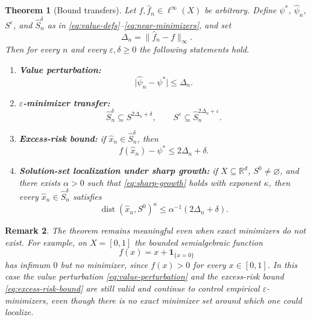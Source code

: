 \documentclass[11pt]{article}
\newtheorem{theorem}{Theorem}[section]
\newtheorem{remark}[theorem]{Remark}
\begin{document}
\begin{theorem}[Bound transfers]\label{thm:deterministic} Let $f,\hat{f}_{n}\in\ell^{\infty}(X)$
be arbitrary. Define $\psi^{*}$, $\hat{\psi}_{n}$, $S^{\varepsilon}$,
and $\hat{S}_{n}^{\delta}$ as in \eqref{eq:value-defs}--\eqref{eq:near-minimizers},
and set
\[
\Delta_{n}=\lVert\hat{f}_{n}-f\rVert_{\infty}.
\]
Then for every $n$ and every $\varepsilon,\delta\ge0$ the following
statements hold. 
\begin{enumerate}[label=(\alph*),itemsep=0.25em]
\item \textbf{Value perturbation:} 
\begin{equation}
\lvert\hat{\psi}_{n}-\psi^{*}\rvert\le\Delta_{n}.\label{eq:value-perturbation}
\end{equation}
\item \textbf{$\varepsilon$-minimizer transfer:} 
\begin{equation}
\hat{S}_{n}^{\delta}\subseteq S^{2\Delta_{n}+\delta},\qquad S^{\varepsilon}\subseteq\hat{S}_{n}^{2\Delta_{n}+\varepsilon}.\label{eq:near-transfer}
\end{equation}
\item \textbf{Excess-risk bound:} if $\hat{x}_{n}\in\hat{S}_{n}^{\delta}$,
then 
\begin{equation}
f(\hat{x}_{n})-\psi^{*}\le2\Delta_{n}+\delta.\label{eq:excess-risk-bound}
\end{equation}
\item \textbf{Solution-set localization under sharp growth:} if $X\subseteq\mathbb{R}^{d}$,
$S^{0}\neq\varnothing$, and there exists $\alpha>0$ such that
\eqref{eq:sharp-growth} holds with exponent $\kappa$, then every
$\hat{x}_{n}\in\hat{S}_{n}^{\delta}$ satisfies
\begin{equation}
\operatorname{dist}(\hat{x}_{n},S^{0})^{\kappa}\le\alpha^{-1}(2\Delta_{n}+\delta).\label{eq:distance-bound}
\end{equation}
\end{enumerate}
\end{theorem}

\begin{remark} The theorem remains meaningful even when exact minimizers
do not exist. For example, on $X=[0,1]$ the bounded semialgebraic
function 
\[
f(x)=x+\mathbf{1}_{\{x=0\}}
\]
has infimum $0$ but no minimizer, since $f(x)>0$ for every $x\in[0,1]$.
In this case the value perturbation \eqref{eq:value-perturbation}
and the excess-risk bound \eqref{eq:excess-risk-bound} are still
valid and continue to control empirical $\varepsilon$-minimizers,
even though there is no exact minimizer set around which one could
localize. \end{remark}
\end{document}
